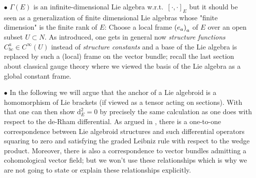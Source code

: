 \begin{remark}
\leavevmode\newline
\indent $\bullet$ $\Gamma(E)$ is an infinite-dimensional Lie algebra w.r.t.~$[\cdot, \cdot]_E$ but it should be seen as a generalization of finite dimensional Lie algebras whose "finite dimension" is the finite rank of $E$: Choose a local frame $\mleft(e_a\mright)_a$ of $E$ over an open subset $U \subset N$. As introduced, one gets in general now \textit{structure functions} $C^a_{bc} \in C^\infty(U)$ instead of \textit{structure constants} and a base of the Lie algebra is replaced by such a (local) frame on the vector bundle; recall the last section about classical gauge theory where we viewed the basis of the Lie algebra as a global constant frame.

$\bullet$ In the following we will argue that the anchor of a Lie algebroid is a homomorphism of Lie brackets (if viewed as a tensor acting on sections). With that one can then show $\mathrm{d}_E^2=0$ by precisely the same calculation as one does with respect to the de-Rham differential. As argued in \cite[\S 18.1, page 131f.]{DaSilva}, there is a one-to-one correspondence between Lie algebroid structures and such differential operators squaring to zero and satisfying the graded Leibniz rule with respect to the wedge product. Moreover, there is also a correspondence to vector bundles admitting a cohomological vector field; but we won't use these relationships which is why we are not going to state or explain these relationships explicitly.
\end{remark}

